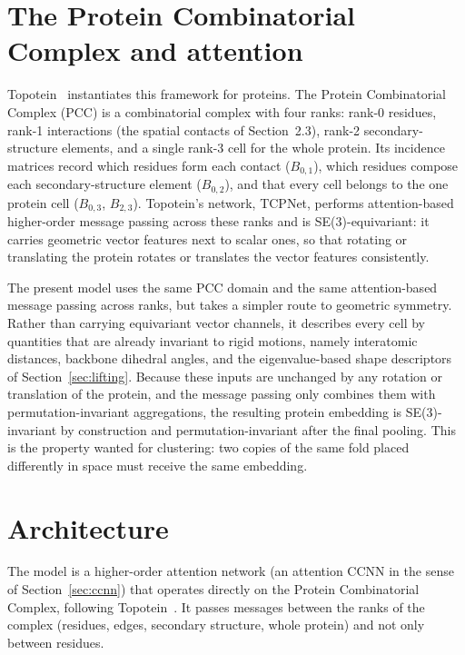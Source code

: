 \documentclass[11pt,a4paper]{article}
\theoremstyle{definition}
\begin{document}
\section{The Protein Combinatorial Complex and attention}
\label{sec:pccnn}

Topotein~\cite{topotein} instantiates this framework for proteins. The Protein
Combinatorial Complex (PCC) is a combinatorial complex with four ranks: rank-0
residues, rank-1 interactions (the spatial contacts of Section~2.3), rank-2
secondary-structure elements, and a single rank-3 cell for the whole protein. Its
incidence matrices record which residues form each contact ($B_{0,1}$), which
residues compose each secondary-structure element ($B_{0,2}$), and that every cell
belongs to the one protein cell ($B_{0,3}$, $B_{2,3}$). Topotein's network,
TCPNet, performs attention-based higher-order message passing across these ranks
and is SE(3)-equivariant: it carries geometric vector features next to scalar
ones, so that rotating or translating the protein rotates or translates the vector
features consistently.

The present model uses the same PCC domain and the same attention-based message
passing across ranks, but takes a simpler route to geometric symmetry. Rather than
carrying equivariant vector channels, it describes every cell by quantities that
are already invariant to rigid motions, namely interatomic distances, backbone
dihedral angles, and the eigenvalue-based shape descriptors of
Section~\ref{sec:lifting}. Because these inputs are unchanged by any rotation or
translation of the protein, and the message passing only combines them with
permutation-invariant aggregations, the resulting protein embedding is
SE(3)-invariant by construction and permutation-invariant after the final
pooling. This is the property wanted for clustering: two copies of the same fold
placed differently in space must receive the same embedding.

\section{Architecture}

The model is a higher-order attention network (an attention CCNN in the sense of
Section~\ref{sec:ccnn}) that operates directly on the Protein Combinatorial Complex, following
Topotein~\cite{topotein,hoan}. It passes messages between the ranks of the complex
(residues, edges, secondary structure, whole protein) and not only between
residues.
\end{document}
